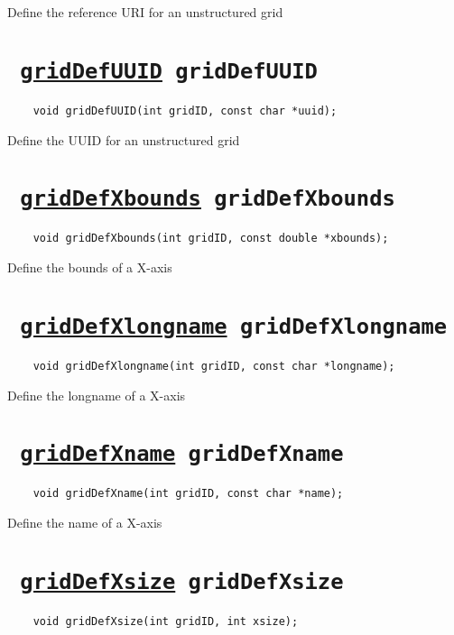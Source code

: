 Define the reference URI for an unstructured grid
\ifpdfoutput{}{(\ref{gridDefReference})}


\section*{\tt 
\ifpdf
\hyperref[gridDefUUID]{gridDefUUID}
\else
gridDefUUID
\fi
}
\begin{verbatim}
    void gridDefUUID(int gridID, const char *uuid);
\end{verbatim}

Define the UUID for an unstructured grid
\ifpdfoutput{}{(\ref{gridDefUUID})}


\section*{\tt 
\ifpdf
\hyperref[gridDefXbounds]{gridDefXbounds}
\else
gridDefXbounds
\fi
}
\begin{verbatim}
    void gridDefXbounds(int gridID, const double *xbounds);
\end{verbatim}

Define the bounds of a X-axis
\ifpdfoutput{}{(\ref{gridDefXbounds})}


\section*{\tt 
\ifpdf
\hyperref[gridDefXlongname]{gridDefXlongname}
\else
gridDefXlongname
\fi
}
\begin{verbatim}
    void gridDefXlongname(int gridID, const char *longname);
\end{verbatim}

Define the longname of a X-axis
\ifpdfoutput{}{(\ref{gridDefXlongname})}


\section*{\tt 
\ifpdf
\hyperref[gridDefXname]{gridDefXname}
\else
gridDefXname
\fi
}
\begin{verbatim}
    void gridDefXname(int gridID, const char *name);
\end{verbatim}

Define the name of a X-axis
\ifpdfoutput{}{(\ref{gridDefXname})}


\section*{\tt 
\ifpdf
\hyperref[gridDefXsize]{gridDefXsize}
\else
gridDefXsize
\fi
}
\begin{verbatim}
    void gridDefXsize(int gridID, int xsize);
\end{verbatim}

